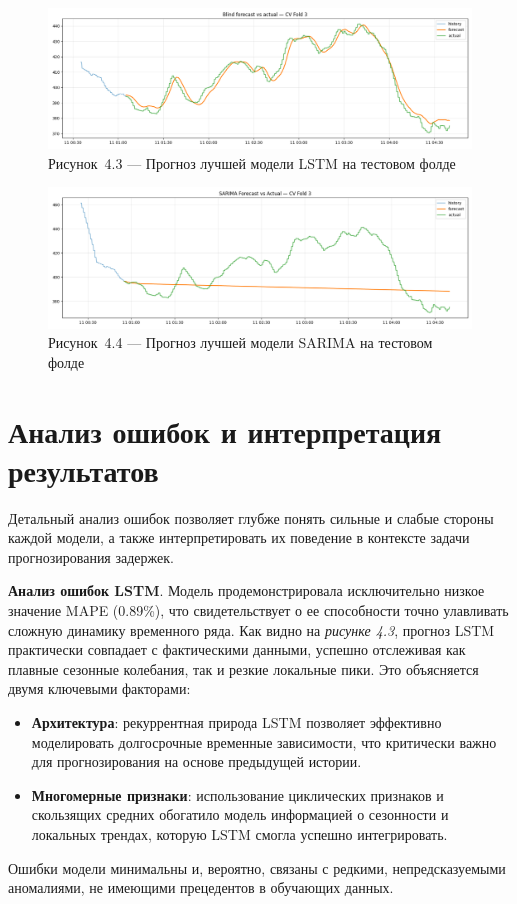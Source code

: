 \begin{figure}[H]
	\centering
	\includegraphics[width=\textwidth]{figures/chapter4/lstm_forecast.png}
	\caption*{Рисунок~4.3 — Прогноз лучшей модели LSTM на тестовом фолде}
	\label{fig:lstm_forecast}
\end{figure}

\begin{figure}[H]
	\centering
	\includegraphics[width=\textwidth]{figures/chapter4/sarima_forecast.png}
	\caption*{Рисунок~4.4 — Прогноз лучшей модели SARIMA на тестовом фолде}
	\label{fig:sarima_forecast}
\end{figure}

\section{Анализ ошибок и интерпретация результатов}
\label{sec:error_analysis}

Детальный анализ ошибок позволяет глубже понять сильные и слабые стороны каждой модели, а также интерпретировать их поведение в контексте задачи прогнозирования задержек.


 \textbf{Анализ ошибок LSTM}. Модель продемонстрировала исключительно низкое значение MAPE (0.89\%), что свидетельствует о ее способности точно улавливать сложную динамику временного ряда. Как видно на \textit{рисунке 4.3}, прогноз LSTM практически совпадает с фактическими данными, успешно отслеживая как плавные сезонные колебания, так и резкие локальные пики. Это объясняется двумя ключевыми факторами:
\begin{itemize}
	\item \textbf{Архитектура}: рекуррентная природа LSTM позволяет эффективно моделировать долгосрочные временные зависимости, что критически важно для прогнозирования на основе предыдущей истории.
	\item \textbf{Многомерные признаки}: использование циклических признаков и скользящих средних обогатило модель информацией о сезонности и локальных трендах, которую LSTM смогла успешно интегрировать.
\end{itemize}
Ошибки модели минимальны и, вероятно, связаны с редкими, непредсказуемыми аномалиями, не имеющими прецедентов в обучающих данных.

